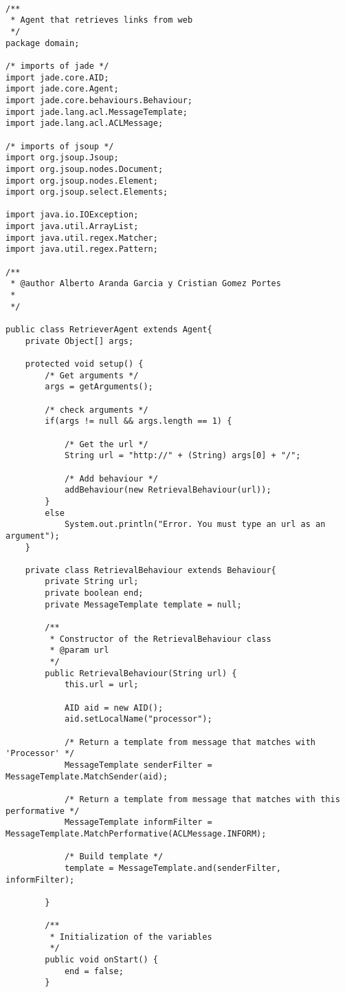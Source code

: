 \documentclass{pre-tfg}
\begin{document}
\begin{lstlisting}[caption=Código de recuperación de links de una URL,style=java]

/**
 * Agent that retrieves links from web
 */
package domain;

/* imports of jade */
import jade.core.AID;
import jade.core.Agent;
import jade.core.behaviours.Behaviour;
import jade.lang.acl.MessageTemplate;
import jade.lang.acl.ACLMessage;

/* imports of jsoup */
import org.jsoup.Jsoup;
import org.jsoup.nodes.Document;
import org.jsoup.nodes.Element;
import org.jsoup.select.Elements;

import java.io.IOException;
import java.util.ArrayList;
import java.util.regex.Matcher;
import java.util.regex.Pattern;

/**
 * @author Alberto Aranda Garcia y Cristian Gomez Portes
 *
 */

public class RetrieverAgent extends Agent{
	private Object[] args;

	protected void setup() {
		/* Get arguments */
		args = getArguments();

		/* check arguments */
		if(args != null && args.length == 1) {

			/* Get the url */
			String url = "http://" + (String) args[0] + "/";

			/* Add behaviour */
			addBehaviour(new RetrievalBehaviour(url));
		}
		else
			System.out.println("Error. You must type an url as an argument");
	}

	private class RetrievalBehaviour extends Behaviour{
		private String url;
		private boolean end;
		private MessageTemplate template = null;

		/**
		 * Constructor of the RetrievalBehaviour class
		 * @param url
		 */
		public RetrievalBehaviour(String url) {
			this.url = url;

			AID aid = new AID();
			aid.setLocalName("processor");

			/* Return a template from message that matches with 'Processor' */
			MessageTemplate senderFilter = MessageTemplate.MatchSender(aid);

			/* Return a template from message that matches with this performative */
			MessageTemplate informFilter = MessageTemplate.MatchPerformative(ACLMessage.INFORM);

			/* Build template */
			template = MessageTemplate.and(senderFilter, informFilter);

		}

		/**
		 * Initialization of the variables
		 */
		public void onStart() {
			end = false;
		}


\end{lstlisting}
\end{document}
